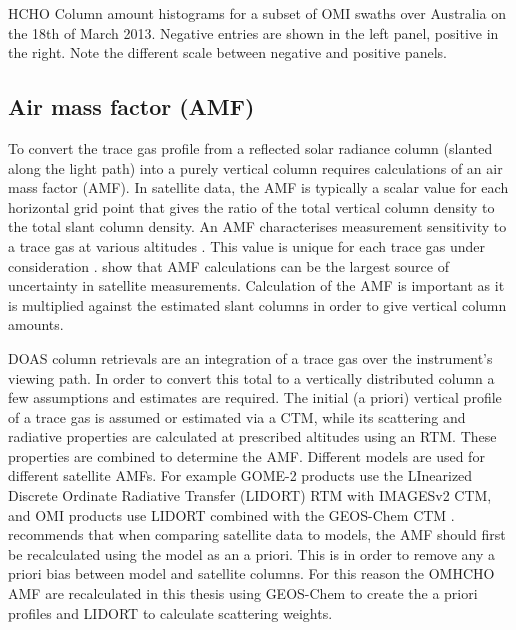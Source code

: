     {
      HCHO Column amount histograms for a subset of OMI swaths over Australia on the 18th of March 2013.
      Negative entries are shown in the left panel, positive in the right.
      Note the different scale between negative and positive panels.
    }{\label{Model:omhcho:pixel_filtering:fig_OMI_negative_hist}}
  
  
  
  \subsection{Air mass factor (AMF)}
  \label{Model:omhcho:amf}
    To convert the trace gas profile from a reflected solar radiance column (slanted along the light path) into a purely vertical column requires calculations of an air mass factor (AMF).
    In satellite data, the AMF is typically a scalar value for each horizontal grid point that gives the ratio of the total vertical column density to the total slant column density.
    An AMF characterises measurement sensitivity to a trace gas at various altitudes \parencite{Palmer2001}.
    This value %
    is unique for each trace gas under consideration \parencite{Palmer2001,Millet2006}.
    \textcite{Lorente2017} show that AMF calculations can be the largest source of uncertainty in satellite measurements.
    Calculation of the AMF is important as it is multiplied against the estimated slant columns in order to give vertical column amounts.
    
    DOAS column retrievals are an integration of a trace gas over the instrument's viewing path.
    In order to convert this total to a vertically distributed column a few assumptions and estimates are required. 
    The initial (a priori) vertical profile of a trace gas is assumed or estimated via a CTM, while its scattering and radiative properties are calculated at prescribed altitudes using an RTM. 
    These properties are combined to determine the AMF.
    Different models are used for different satellite AMFs.
    For example GOME-2 products %
    use the LInearized Discrete Ordinate Radiative Transfer (LIDORT) RTM with IMAGESv2 CTM, and OMI products use LIDORT combined with the GEOS-Chem CTM \parencite{Chance2002, Abad2015}.
    \textcite{Lamsal2014} recommends that when comparing satellite data to models, the AMF should first be recalculated using the model as an a priori.
    This is in order to remove any a priori bias between model and satellite columns.
    For this reason the OMHCHO AMF are recalculated in this thesis using GEOS-Chem to create the a priori profiles and LIDORT to calculate scattering weights.
    
